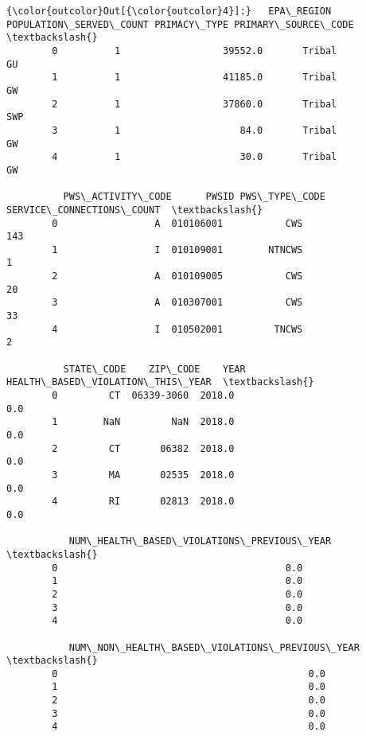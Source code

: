 \documentclass[11pt]{article}
\begin{document}
\begin{Verbatim}[commandchars=\\\{\}]
{\color{outcolor}Out[{\color{outcolor}4}]:}   EPA\_REGION  POPULATION\_SERVED\_COUNT PRIMACY\_TYPE PRIMARY\_SOURCE\_CODE  \textbackslash{}
        0          1                  39552.0       Tribal                  GU   
        1          1                  41185.0       Tribal                  GW   
        2          1                  37860.0       Tribal                 SWP   
        3          1                     84.0       Tribal                  GW   
        4          1                     30.0       Tribal                  GW   
        
          PWS\_ACTIVITY\_CODE      PWSID PWS\_TYPE\_CODE SERVICE\_CONNECTIONS\_COUNT  \textbackslash{}
        0                 A  010106001           CWS                       143   
        1                 I  010109001        NTNCWS                         1   
        2                 A  010109005           CWS                        20   
        3                 A  010307001           CWS                        33   
        4                 I  010502001         TNCWS                         2   
        
          STATE\_CODE    ZIP\_CODE    YEAR  HEALTH\_BASED\_VIOLATION\_THIS\_YEAR  \textbackslash{}
        0         CT  06339-3060  2018.0                               0.0   
        1        NaN         NaN  2018.0                               0.0   
        2         CT       06382  2018.0                               0.0   
        3         MA       02535  2018.0                               0.0   
        4         RI       02813  2018.0                               0.0   
        
           NUM\_HEALTH\_BASED\_VIOLATIONS\_PREVIOUS\_YEAR  \textbackslash{}
        0                                        0.0   
        1                                        0.0   
        2                                        0.0   
        3                                        0.0   
        4                                        0.0   
        
           NUM\_NON\_HEALTH\_BASED\_VIOLATIONS\_PREVIOUS\_YEAR  \textbackslash{}
        0                                            0.0   
        1                                            0.0   
        2                                            0.0   
        3                                            0.0   
        4                                            0.0   
        

\end{Verbatim}
\end{document}
